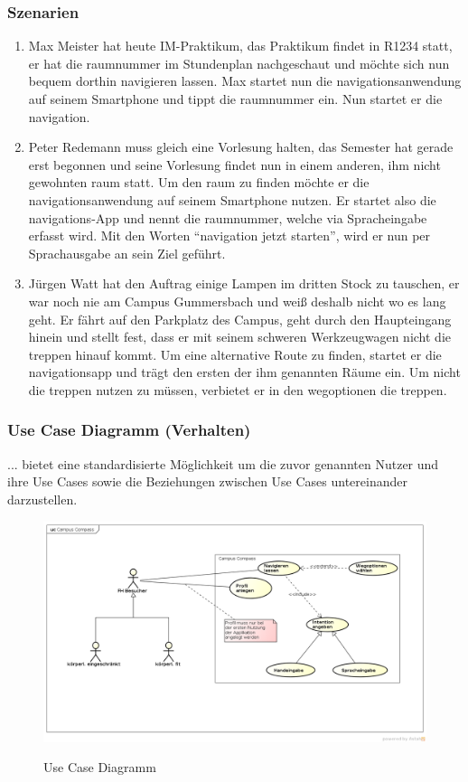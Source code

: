 \subsubsection*{Szenarien}
\begin{enumerate}
  \item Max Meister hat heute IM-Praktikum, das Praktikum findet in R1234 statt, er hat die \gls{raum}nummer im Stundenplan nachgeschaut und möchte sich nun bequem dorthin navigieren lassen. Max startet nun die \gls{navigation}sanwendung auf seinem Smartphone und tippt die \gls{raum}nummer ein. Nun startet er die \gls{navigation}.
  \item Peter Redemann muss gleich eine Vorlesung halten, das Semester hat gerade erst begonnen und seine Vorlesung findet nun in einem anderen, ihm nicht gewohnten \gls{raum} statt. Um den \gls{raum} zu finden möchte er die \gls{navigation}sanwendung auf seinem Smartphone nutzen. Er startet also die \gls{navigation}s-App und nennt die \gls{raum}nummer, welche via Spracheingabe erfasst wird. Mit den Worten “\gls{navigation} jetzt starten”, wird er nun per Sprachausgabe an sein Ziel geführt.
  \item Jürgen Watt hat den Auftrag einige Lampen im dritten Stock zu tauschen, er war noch nie am Campus Gummersbach und weiß deshalb nicht wo es lang geht. Er fährt auf den Parkplatz des Campus, geht durch den Haupteingang hinein und stellt fest, dass er mit seinem schweren Werkzeugwagen nicht die \gls{treppe}n hinauf kommt. Um eine alternative Route zu finden, startet er die \gls{navigation}sapp und trägt den ersten der ihm genannten Räume ein. Um nicht die \gls{treppe}n nutzen zu müssen, verbietet er in den \gls{weg}optionen die \gls{treppe}n.
\end{enumerate}

\subsubsection*{Use Case Diagramm (Verhalten)}
... bietet eine standardisierte Möglichkeit um die zuvor genannten Nutzer und ihre Use Cases sowie die Beziehungen zwischen Use Cases untereinander darzustellen.

\begin{figure}[hbt]
  \centering
  \includegraphics[width=\linewidth]{img/use-case-diagram.png}
  \label{img:use-case-diagramm}
  \caption{Use Case Diagramm}
\end{figure}

